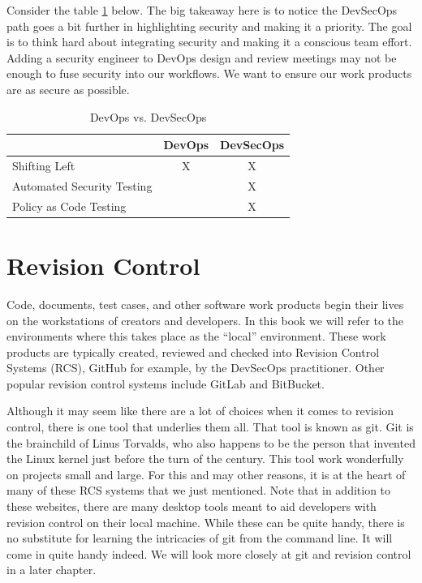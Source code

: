 \justifying
Consider the table \ref{DevSecOps} below. The big takeaway here is to notice the
DevSecOps path goes a bit further
in highlighting security and making it a priority. The goal is to think hard about integrating
security and making it a conscious team effort. Adding a security engineer to DevOps design
and review meetings may not be enough to fuse security into our workflows. We want to ensure
our work products are as secure as possible.

\begin{table}[ht]
    \centering
    \begin{tabular}{|l|c|c|}\hline
                                   & DevOps & DevSecOps \\\hline
        Shifting Left              &   X    &    X       \\\hline
        Automated Security Testing &        &    X       \\\hline
        Policy as Code Testing     &        &    X       \\\hline

    \end{tabular}
\caption{DevOps vs. DevSecOps}
\label{DevSecOps}
\end{table}

\section{Revision Control}

\justifying
Code, documents, test cases, and other software work products begin their lives on the workstations of creators
and developers. In this book we will refer to the environments where this takes place as the ``local'' environment.
These work products are typically created, reviewed and checked into Revision Control Systems
(RCS), GitHub for example, by the DevSecOps practitioner.
Other popular revision control systems include GitLab and BitBucket.

\justifying
Although it may seem like there are a lot of choices when it comes to revision control, there
is one tool that
underlies them all. That tool is known as git. Git is the brainchild of Linus Torvalds, who also
happens to be
the person that invented the Linux kernel just before the turn of the century. This tool work wonderfully
on projects small
and large. For this and may other reasons, it is at the heart of many of these RCS systems that we just mentioned. Note that
in addition to these websites, there are many desktop tools meant to aid developers with revision control on their local
machine. While these can be quite handy, there is no substitute for learning the intricacies of git from the command
line. It will come in quite handy indeed.
\justifying
We will look more closely at git and revision control in a later chapter.

